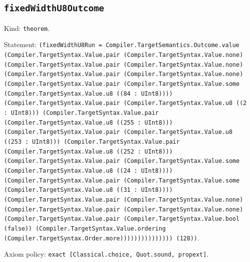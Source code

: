 \documentclass[11pt]{article}
\begin{document}
\subsection*{\texttt{fixedWidthU8Outcome}}
\noindent Kind: \texttt{theorem}.\par
\noindent Statement: \texttt{(fixedWidthU8Run = Compiler.TargetSemantics.Outcome.value (Compiler.TargetSyntax.Value.pair (Compiler.TargetSyntax.Value.none) (Compiler.TargetSyntax.Value.pair (Compiler.TargetSyntax.Value.none) (Compiler.TargetSyntax.Value.pair (Compiler.TargetSyntax.Value.none) (Compiler.TargetSyntax.Value.pair (Compiler.TargetSyntax.Value.some (Compiler.TargetSyntax.Value.u8 ((84 : UInt8)))) (Compiler.TargetSyntax.Value.pair (Compiler.TargetSyntax.Value.u8 ((2 : UInt8))) (Compiler.TargetSyntax.Value.pair (Compiler.TargetSyntax.Value.u8 ((255 : UInt8))) (Compiler.TargetSyntax.Value.pair (Compiler.TargetSyntax.Value.u8 ((253 : UInt8))) (Compiler.TargetSyntax.Value.pair (Compiler.TargetSyntax.Value.u8 ((252 : UInt8))) (Compiler.TargetSyntax.Value.pair (Compiler.TargetSyntax.Value.some (Compiler.TargetSyntax.Value.u8 ((24 : UInt8)))) (Compiler.TargetSyntax.Value.pair (Compiler.TargetSyntax.Value.some (Compiler.TargetSyntax.Value.u8 ((31 : UInt8)))) (Compiler.TargetSyntax.Value.pair (Compiler.TargetSyntax.Value.none) (Compiler.TargetSyntax.Value.pair (Compiler.TargetSyntax.Value.none) (Compiler.TargetSyntax.Value.pair (Compiler.TargetSyntax.Value.bool (false)) (Compiler.TargetSyntax.Value.ordering (Compiler.TargetSyntax.Order.more))))))))))))))) (128))}.\par
\noindent Axiom policy: \texttt{exact [Classical.choice, Quot.sound, propext]}.\par
\end{document}
